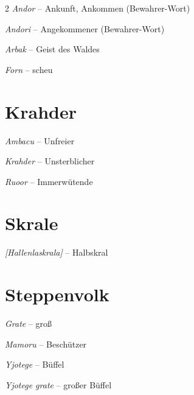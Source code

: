 \documentclass[10pt, a4paper, oneside]{book}
\newcommand{\reflegende}[1]{\hyperref[Legende: #1]{#1}}
\newcommand{\refprodukt}[1]{\hyperref[Produkt: #1]{#1}}
\newcommand{\refstorytext}[1]{\hyperref[Storytext: #1]{#1}}
\begin{document}
\begin{multicols}{2}
\textit{Andor} – Ankunft, Ankommen
(Bewahrer-Wort)

\textit{Andori} – Angekommener
(Bewahrer-Wort)

\textit{Arbak} – Geist des Waldes

\textit{Forn} – scheu





\section{Krahder}

\textit{Ambacu} – Unfreier

\textit{Krahder} – Unsterblicher

\textit{Ruoor} – Immerwütende






\section{Skrale}


\textit{[Hallenlaskrala]} – Halbskral



\section{Steppenvolk}

\textit{Grate} – groß

\textit{Mamoru} – Beschützer

\textit{Yjotege} – Büffel

\textit{Yjotege grate} – großer Büffel






\end{multicols}
\end{document}

